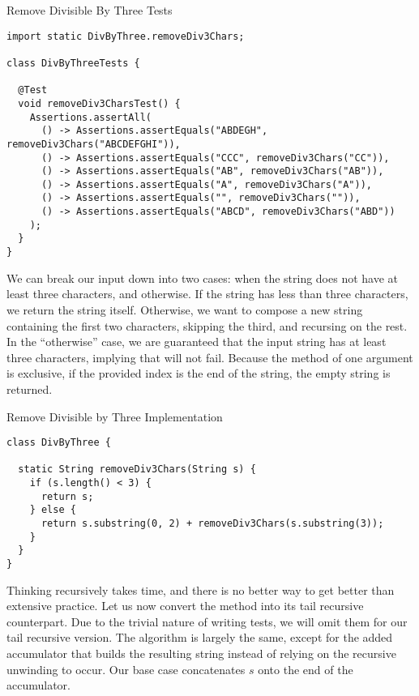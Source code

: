 \begin{cl}[]{Remove Divisible By Three Tests}
\begin{lstlisting}[language=MyJava]
import static DivByThree.removeDiv3Chars;

class DivByThreeTests {

  @Test
  void removeDiv3CharsTest() {
    Assertions.assertAll(
      () -> Assertions.assertEquals("ABDEGH", removeDiv3Chars("ABCDEFGHI")),
      () -> Assertions.assertEquals("CCC", removeDiv3Chars("CC")),
      () -> Assertions.assertEquals("AB", removeDiv3Chars("AB")),
      () -> Assertions.assertEquals("A", removeDiv3Chars("A")),
      () -> Assertions.assertEquals("", removeDiv3Chars("")),
      () -> Assertions.assertEquals("ABCD", removeDiv3Chars("ABD"))
    );
  }
}
\end{lstlisting}
\end{cl}

We can break our input down into two cases: when the string does not have at least three characters, and otherwise. If the string has less than three characters, we return the string itself. Otherwise, we want to compose a new string containing the first two characters, skipping the third, and recursing on the rest. In the ``otherwise'' case, we are guaranteed that the input string has at least three characters, implying that  will not fail. Because the  method of one argument is exclusive, if the provided index is the end of the string, the empty string is returned.

\begin{cl}[]{Remove Divisible by Three Implementation}
\begin{lstlisting}[language=MyJava]
class DivByThree {

  static String removeDiv3Chars(String s) {
    if (s.length() < 3) {
      return s;
    } else {
      return s.substring(0, 2) + removeDiv3Chars(s.substring(3));
    }
  }
}
\end{lstlisting}
\end{cl}
Thinking recursively takes time, and there is no better way to get better than extensive practice. Let us now convert the method into its tail recursive counterpart. Due to the trivial nature of writing tests, we will omit them for our tail recursive version. The algorithm is largely the same, except for the added accumulator that builds the resulting string instead of relying on the recursive unwinding to occur. Our base case concatenates $s$ onto the end of the accumulator.

